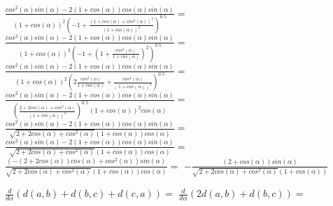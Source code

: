 \documentclass[a4paper,10pt]{article}
\begin{document}
$\frac{cos^{2}\left(\alpha\right) sin\left(\alpha\right) - 2 \left(1 + cos\left(\alpha\right)\right) cos\left(\alpha\right) sin\left(\alpha\right)}{\left(1 + cos\left(\alpha\right)\right)^{2} \left(-1 + \frac{\left(1 + cos\left(\alpha\right) + cos^{2}\left(\alpha\right)\right)^{2}}{\left(1 + cos\left(\alpha\right)\right)^{2}}\right)^{0.5}}=$
$\frac{cos^{2}\left(\alpha\right) sin\left(\alpha\right) - 2 \left(1 + cos\left(\alpha\right)\right) cos\left(\alpha\right) sin\left(\alpha\right)}{\left(1 + cos\left(\alpha\right)\right)^{2} \left(-1 + \left(1 + \frac{cos^{2}\left(\alpha\right)}{1 + cos\left(\alpha\right)}\right)^{2}\right)^{0.5}}=$
$\frac{cos^{2}\left(\alpha\right) sin\left(\alpha\right) - 2 \left(1 + cos\left(\alpha\right)\right) cos\left(\alpha\right) sin\left(\alpha\right)}{\left(1 + cos\left(\alpha\right)\right)^{2} \left(2 \frac{cos^{2}\left(\alpha\right)}{1 + cos\left(\alpha\right)} + \frac{cos^{4}\left(\alpha\right)}{\left(1 + cos\left(\alpha\right)\right)^{2}}\right)^{0.5}}=$
$\frac{cos^{2}\left(\alpha\right) sin\left(\alpha\right) - 2 \left(1 + cos\left(\alpha\right)\right) cos\left(\alpha\right) sin\left(\alpha\right)}{\left(\frac{2 + 2 cos\left(\alpha\right) + cos^{2}\left(\alpha\right)}{\left(1 + cos\left(\alpha\right)\right)^{2}}\right)^{0.5} \left(1 + cos\left(\alpha\right)\right)^{2} cos\left(\alpha\right)}=$
$\frac{cos^{2}\left(\alpha\right) sin\left(\alpha\right) - 2 \left(1 + cos\left(\alpha\right)\right) cos\left(\alpha\right) sin\left(\alpha\right)}{\sqrt{2 + 2 cos\left(\alpha\right) + cos^{2}\left(\alpha\right)} \left(1 + cos\left(\alpha\right)\right) cos\left(\alpha\right)}=$
$\frac{cos^{2}\left(\alpha\right) sin\left(\alpha\right) - 2 \left(1 + cos\left(\alpha\right)\right) cos\left(\alpha\right) sin\left(\alpha\right)}{\sqrt{2 + 2 cos\left(\alpha\right) + cos^{2}\left(\alpha\right)} \left(1 + cos\left(\alpha\right)\right) cos\left(\alpha\right)}=$
$\frac{\left(- \left(2 + 2 cos\left(\alpha\right)\right) cos\left(\alpha\right) + cos^{2}\left(\alpha\right)\right) sin\left(\alpha\right)}{\sqrt{2 + 2 cos\left(\alpha\right) + cos^{2}\left(\alpha\right)} \left(1 + cos\left(\alpha\right)\right) cos\left(\alpha\right)}=$
$- \frac{\left(2 + cos\left(\alpha\right)\right) sin\left(\alpha\right)}{\sqrt{2 + 2 cos\left(\alpha\right) + cos^{2}\left(\alpha\right)} \left(1 + cos\left(\alpha\right)\right)}$



$\frac{d}{d\alpha}\left(d\left(a, b\right) + d\left(b, c\right) + d\left(c, a\right)\right) = $
$\frac{d}{d\alpha}\left(2d\left(a, b\right) + d\left(b, c\right)\right) = $
\end{document}
